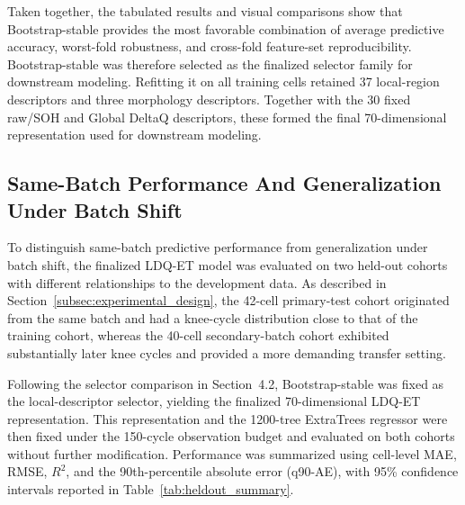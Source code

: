 \documentclass[pdflatex,sn-mathphys-num]{sn-jnl}
\begin{document}
Taken together, the tabulated results and visual comparisons show that Bootstrap-stable provides the most favorable combination of average predictive accuracy, worst-fold robustness, and cross-fold feature-set reproducibility. Bootstrap-stable was therefore selected as the finalized selector family for downstream modeling. Refitting it on all training cells retained 37 local-region descriptors and three morphology descriptors. Together with the 30 fixed raw/SOH and Global DeltaQ descriptors, these formed the final 70-dimensional representation used for downstream modeling.

\FloatBarrier
\subsection{Same-Batch Performance And Generalization Under Batch Shift}
\label{subsec:test_performance}

To distinguish same-batch predictive performance from generalization under batch shift, the finalized LDQ-ET model was evaluated on two held-out cohorts with different relationships to the development data. As described in Section~\ref{subsec:experimental_design}, the 42-cell primary-test cohort originated from the same batch and had a knee-cycle distribution close to that of the training cohort, whereas the 40-cell secondary-batch cohort exhibited substantially later knee cycles and provided a more demanding transfer setting.

Following the selector comparison in Section~4.2, Bootstrap-stable was fixed as the local-descriptor selector, yielding the finalized 70-dimensional LDQ-ET representation. This representation and the 1200-tree ExtraTrees regressor were then fixed under the 150-cycle observation budget and evaluated on both cohorts without further modification. Performance was summarized using cell-level MAE, RMSE, $R^2$, and the 90th-percentile absolute error (q90-AE), with 95\% confidence intervals reported in Table~\ref{tab:heldout_summary}.
\end{document}

